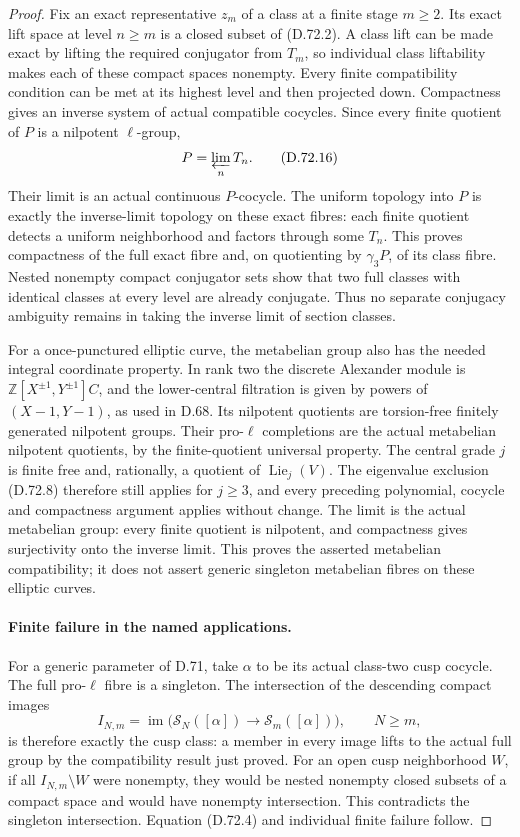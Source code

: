 \begin{proof}
Fix an exact representative \(z_m\) of
a class at a finite stage \(m\ge2\).
Its exact lift space at level \(n\ge m\)
is a closed subset of (D.72.2). A class
lift can be made exact by lifting the
required conjugator from \(T_m\), so
individual class liftability makes each
of these compact spaces nonempty.
Every finite compatibility condition
can be met at its highest level and
then projected down. Compactness gives
an inverse system of actual compatible
cocycles. Since every finite quotient
of \(P\) is a nilpotent \(\ell\)-group,
\[
                         P=\varprojlim_n T_n.          \tag{D.72.16}
\]
Their limit is an actual continuous
\(P\)-cocycle. The uniform topology
into \(P\) is exactly the inverse-limit
topology on these exact fibres: each
finite quotient detects a uniform
neighborhood and factors through some
\(T_n\). This proves compactness of
the full exact fibre and, on quotienting
by \(\gamma_3P\), of its class fibre.
Nested nonempty compact conjugator
sets show that two full classes with
identical classes at every level are
already conjugate. Thus no separate
conjugacy ambiguity remains in taking
the inverse limit of section classes.

For a once-punctured elliptic curve,
the metabelian group also has the
needed integral coordinate property.
In rank two the discrete Alexander
module is
\(\mathbb Z[X^{\pm1},Y^{\pm1}]C\),
and the lower-central filtration is
given by powers of \((X-1,Y-1)\),
as used in D.68. Its nilpotent
quotients are torsion-free finitely
generated nilpotent groups. Their
pro-\(\ell\) completions are the
actual metabelian nilpotent quotients,
by the finite-quotient universal
property. The central grade \(j\)
is finite free and, rationally,
a quotient of \(\operatorname{Lie}_j(V)\).
The eigenvalue exclusion (D.72.8)
therefore still applies for \(j\ge3\),
and every preceding polynomial,
cocycle and compactness argument
applies without change. The limit
is the actual metabelian group:
every finite quotient is nilpotent,
and compactness gives surjectivity
onto the inverse limit. This proves
the asserted metabelian compatibility;
it does not assert generic singleton
metabelian fibres on these elliptic
curves.

\paragraph{Finite failure in the named applications.}
For a generic parameter of D.71,
take \(\alpha\) to be its actual
class-two cusp cocycle. The full
pro-\(\ell\) fibre is a singleton.
The intersection of the descending
compact images
\[
 I_{N,m}=
 \operatorname{im}\bigl(\mathscr S_N([\alpha])
                \longrightarrow\mathscr S_m([\alpha])\bigr),
                              \qquad N\ge m,           \tag{D.72.17}
\]
is therefore exactly the cusp class:
a member in every image lifts to
the actual full group by the
compatibility result just proved.
For an open cusp neighborhood \(W\),
if all \(I_{N,m}\setminus W\) were
nonempty, they would be nested
nonempty closed subsets of a
compact space and would have
nonempty intersection. This
contradicts the singleton
intersection. Equation (D.72.4)
and individual finite failure
follow.


\end{proof}

